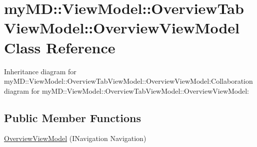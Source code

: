 \hypertarget{classmy_m_d_1_1_view_model_1_1_overview_tab_view_model_1_1_overview_view_model}{
\section{my\-MD::View\-Model::Overview\-Tab\-View\-Model::Overview\-View\-Model Class Reference}
\label{dc/d21/classmy_m_d_1_1_view_model_1_1_overview_tab_view_model_1_1_overview_view_model}
}
Inheritance diagram for my\-MD::View\-Model::Overview\-Tab\-View\-Model::Overview\-View\-Model:Collaboration diagram for my\-MD::View\-Model::Overview\-Tab\-View\-Model::Overview\-View\-Model:\subsection*{Public Member Functions}
\begin{CompactItemize}
\item 
\hypertarget{classmy_m_d_1_1_view_model_1_1_overview_tab_view_model_1_1_overview_view_model_186233af46ee200f6cb370877b56661b}{
\hyperlink{classmy_m_d_1_1_view_model_1_1_overview_tab_view_model_1_1_overview_view_model_186233af46ee200f6cb370877b56661b}{Overview\-View\-Model} (INavigation Navigation)}
\label{dc/d21/classmy_m_d_1_1_view_model_1_1_overview_tab_view_model_1_1_overview_view_model_186233af46ee200f6cb370877b56661b}

\end{CompactItemize}
